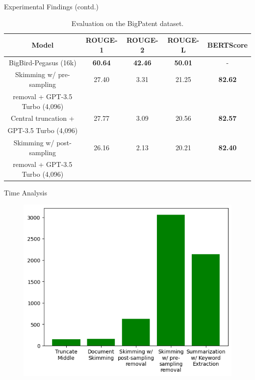 		\begin{frame}{Experimental Findings (contd.)}

			\begin{table}[!ht]
				\centering
				\tiny
			
				\begin{tabular}{c c c c c}
					\hline
					Model & ROUGE-1 & ROUGE-2 & ROUGE-L & BERTScore \\
					\hline
					BigBird-Pegasus (16k) & \textbf{60.64} & \textbf{42.46} & \textbf{50.01} & - \\
					\hline
					Skimming w/ pre-sampling & 27.40 & 3.31 & 21.25 & \textbf{82.62} \\
					removal + GPT-3.5 Turbo (4,096) & & & & \\
					Central truncation + & 27.77 & 3.09 & 20.56 & \textbf{82.57} \\
					GPT-3.5 Turbo (4,096) & & & & \\
					Skimming w/ post-sampling & 26.16 & 2.13 & 20.21 & \textbf{82.40} \\
					removal + GPT-3.5 Turbo (4,096) & & & & \\
					\hline
				\end{tabular}
			
				\caption{Evaluation on the BigPatent dataset.}
			\end{table}

		\end{frame}

		\begin{frame}{Time Analysis}

			\begin{figure}
				\centering
				\includegraphics[width=.8\textwidth]{../Report/Images/encoder-times.png}
			\end{figure}
			
		\end{frame}
